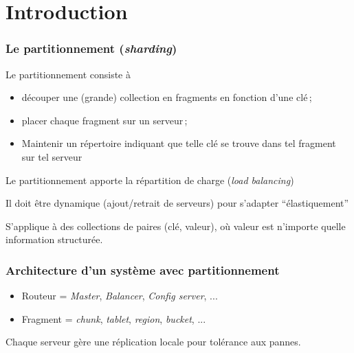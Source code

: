 
\section{Introduction}


\begin{frame}
\frametitle{Le partitionnement (\textit{sharding})}

Le partitionnement consiste à  

\begin{itemize}
  \item \alert{découper} une (grande) collection
      en \alert{fragments} en fonction d'une \alert{clé}\,;
      \item placer chaque fragment sur un \alert{serveur}\,;
      \item Maintenir un \alert{répertoire} indiquant  que telle \alert{clé} se trouve dans tel \alert{fragment}
          sur tel \alert{serveur}
\end{itemize}
 
\vfill

Le partitionnement apporte la \alert{répartition de charge} (\textit{load balancing})

\vfill

Il doit être \alert{dynamique} (ajout/retrait de serveurs) pour s'adapter ``élastiquement'' 
 
 \vfill
 
 S'applique à des collections de paires (clé, valeur), où valeur est n'importe quelle information structurée.
\end{frame}

\begin{frame}
\frametitle{Architecture d'un système avec partitionnement}

      
\begin{itemize}
  \item Routeur = \textit{Master}, \textit{Balancer}, \textit{Config server}, ...
  \item Fragment = \textit{chunk}, \textit{tablet}, \textit{region}, \textit{bucket}, ...
\end{itemize}

\begin{remark}
Chaque serveur gère une réplication locale pour tolérance aux pannes.
\end{remark}
\end{frame}


